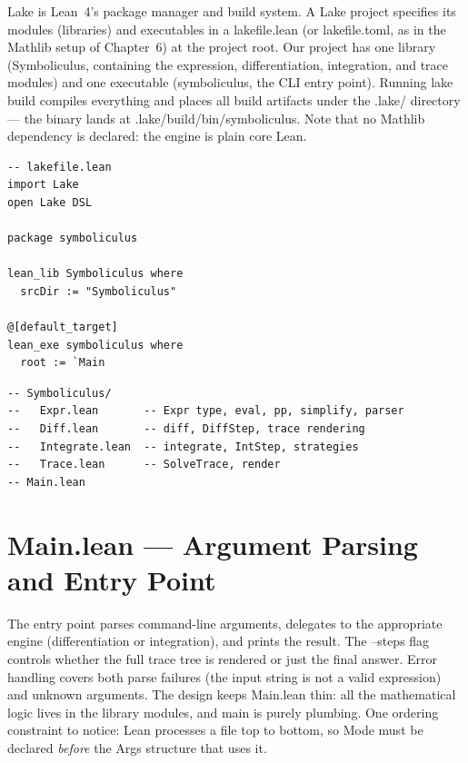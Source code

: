\documentclass[12pt, openany]{book}
\theoremstyle{plain}
\theoremstyle{definition}
\theoremstyle{remark}
\newcommand{\li}[1]{{\ttfamily\small\color{tealaccent}#1}}
\begin{document}
Lake is Lean~4's package manager and build system.  A Lake project specifies its modules (libraries) and executables in a \li{lakefile.lean} (or \li{lakefile.toml}, as in the Mathlib setup of Chapter~6) at the project root.  Our project has one library (\li{Symboliculus}, containing the expression, differentiation, integration, and trace modules) and one executable (\li{symboliculus}, the CLI entry point).  Running \li{lake build} compiles everything and places all build artifacts under the \li{.lake/} directory --- the binary lands at \li{.lake/build/bin/symboliculus}.  Note that no Mathlib dependency is declared: the engine is plain core Lean.

\begin{leanbox}
\begin{lstlisting}
-- lakefile.lean
import Lake
open Lake DSL

package symboliculus

lean_lib Symboliculus where
  srcDir := "Symboliculus"

@[default_target]
lean_exe symboliculus where
  root := `Main
\end{lstlisting}
\end{leanbox}
\color{black}

\begin{leanbox}
\begin{lstlisting}
-- Symboliculus/
--   Expr.lean       -- Expr type, eval, pp, simplify, parser
--   Diff.lean       -- diff, DiffStep, trace rendering
--   Integrate.lean  -- integrate, IntStep, strategies
--   Trace.lean      -- SolveTrace, render
-- Main.lean
\end{lstlisting}
\end{leanbox}
\color{black}

\section{\li{Main.lean} --- Argument Parsing and Entry Point}

The entry point parses command-line arguments, delegates to the appropriate engine (differentiation or integration), and prints the result.  The \li{--steps} flag controls whether the full trace tree is rendered or just the final answer.  Error handling covers both parse failures (the input string is not a valid expression) and unknown arguments.  The design keeps \li{Main.lean} thin: all the mathematical logic lives in the library modules, and \li{main} is purely plumbing.  One ordering constraint to notice: Lean processes a file top to bottom, so \li{Mode} must be declared \emph{before} the \li{Args} structure that uses it.
\end{document}
